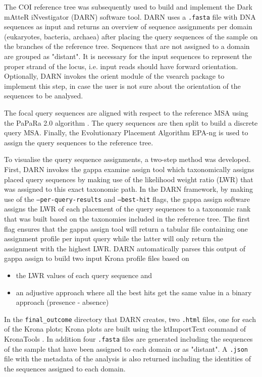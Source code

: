   The COI reference tree was subsequently used to build and implement the Dark mAtteR iNvestigator (DARN) software tool. 
   DARN uses a \texttt{.fasta} file with DNA sequences as input and returns an overview of sequence assignments per domain (eukaryotes, bacteria, archaea) after placing the query sequences of the sample on the branches of the reference tree. 
   Sequences that are not assigned to a domain are grouped as "distant". 
   It is necessary for the input sequences to represent the proper strand of the locus, 
   i.e. input reads should have forward orientation. 
   Optionally, DARN invokes the orient module of the vsearch package \citep{rognes2016vsearch} to implement this step, in case the user is not sure about the orientation of the sequences to be analysed.

   The focal query sequences are aligned with respect to the reference MSA using the PaPaRa 2.0 algorithm \citep{berger2012papara}. 
   The query sequences are then split to build a discrete query MSA. 
   Finally, the Evolutionary Placement Algorithm EPA-ng \citep{barbera2019epa} is used to assign the query sequences to the reference tree.

   To visualise the query sequence assignments, a two-step method was developed. 
   First, DARN invokes the gappa examine assign tool which taxonomically assigns placed query sequences by making use of the likelihood weight ratio (LWR) that was assigned to this exact taxonomic path. 
   In the DARN framework, by making use of the \texttt{--per-query-results} and \texttt{--best-hit} flags, the gappa assign software assigns the LWR of each placement of the query sequences to a taxonomic rank that was built based on the taxonomies included in the reference tree. 
   The first flag ensures that the gappa assign tool will return a tabular file containing one assignment profile per input query while the latter will only return the assignment with the highest LWR. 
   DARN automatically parses this output of gappa assign to build two input Krona profile files based on 

   \begin{itemize}
      \item the LWR values of each query sequence and
      \item an adjustive approach where all the best hits get the same value in a binary approach (presence - absence)
   \end{itemize}
   
   In the \texttt{final\_outcome} directory that DARN creates, two \texttt{.html} files, one for each of the Krona plots; 
   Krona plots are built using the ktImportText command of KronaTools \citep{ondov2011interactive}. 
   In addition four \texttt{.fasta} files are generated including the sequences of the sample that have been assigned to each domain or as "distant". 
   A \texttt{.json} file with the metadata of the analysis is also returned including the identities of the sequences assigned to each domain.

